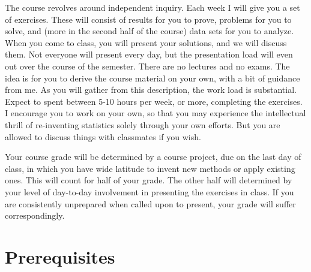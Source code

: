\documentclass{mynotes}
\begin{document}
The course revolves around independent inquiry.  Each week I will give you a set of exercises.  These will consist of results for you to prove, problems for you to solve, and (more in the second half of the course) data sets for you to analyze.  When you come to class, you will present your solutions, and we will discuss them.  Not everyone will present every day, but the presentation load will even out over the course of the semester.  There are no lectures and no exams.  The idea is for you to derive the course material on your own, with a bit of guidance from me.  As you will gather from this description, the work load is substantial.  Expect to spent between 5-10 hours per week, or more, completing the exercises.  I encourage you to work on your own, so that you may experience the intellectual thrill of re-inventing statistics solely through your own efforts.  But you are allowed to discuss things with classmates if you wish.

Your course grade will be determined by a course project, due on the last day of class, in which you have wide latitude to invent new methods or apply existing ones.  This will count for half of your grade.  The other half will determined by your level of day-to-day involvement in presenting the exercises in class.  If you are consistently unprepared when called upon to present, your grade will suffer correspondingly.

\section{Prerequisites}
\end{document}
